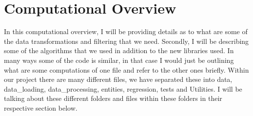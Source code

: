 \documentclass[fontsize=11pt]{article}
\begin{document}
\section*{Computational Overview}

In this computational overview, I will be providing details as to what are some of the data transformations and filtering that we need. Secondly, I will be describing some of the algorithms that we used in addition to the new libraries used. In many ways some of the code is similar, in that case I would just be outlining what are some computations of one file and refer to the other ones briefly. Within our project there are many different files, we have separated these into data, data\_loading, data\_processing, entities, regression, tests and Utilities. I will be talking about these different folders and files within these folders in their respective section below.
\end{document}
